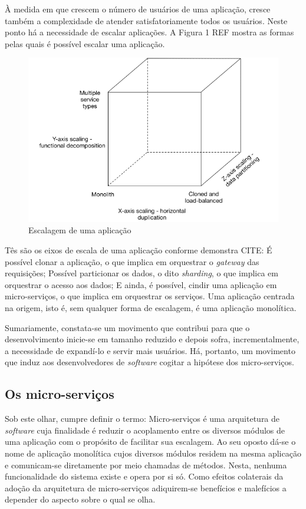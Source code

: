À medida em que crescem o número de usuários de uma aplicação, cresce também a complexidade de atender satisfatoriamente todos os usuários. Neste ponto há a necessidade de escalar aplicações. A Figura 1 REF mostra as formas pelas quais é possível escalar uma aplicação.

\begin{figure}
\centering
\includegraphics[width=14cm]{scale}
\caption{Escalagem de uma aplicação}
\end{figure}

Tês são os eixos de escala de uma aplicação conforme demonstra CITE: É possível clonar a aplicação, o que implica em orquestrar o \textit{gateway} das requisições; Possível particionar os dados, o dito \textit{sharding}, o que implica em orquestrar o acesso aos dados; E ainda, é possível, cindir uma aplicação em micro-serviços, o que implica em orquestrar os serviços. Uma aplicação centrada na origem, isto é, sem qualquer forma de escalagem, é uma aplicação monolítica.

Sumariamente, constata-se um movimento que contribui para que o desenvolvimento inicie-se em tamanho reduzido e depois sofra, incrementalmente, a necessidade de expandí-lo e servir mais usuários. Há, portanto, um movimento que induz aos desenvolvedores de \textit{software} cogitar a hipótese dos micro-serviços.

\subsection{Os micro-serviços}

Sob este olhar, cumpre definir o termo: Micro-serviços é uma arquitetura de \textit{software} cuja finalidade é reduzir o acoplamento entre os diversos módulos de uma aplicação com o propósito de facilitar sua escalagem. Ao seu oposto dá-se o nome de aplicação monolítica cujos diversos módulos residem na mesma aplicação e comunicam-se diretamente por meio chamadas de métodos. Nesta, nenhuma funcionalidade do sistema existe e opera por si só. Como efeitos colaterais da adoção da arquitetura de micro-serviços adiquirem-se benefícios e malefícios a depender do aspecto sobre o qual se olha.

